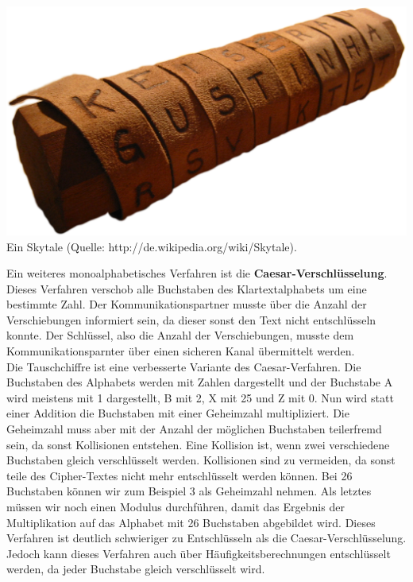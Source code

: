 \documentclass[12pt,a4paper]{report}
\begin{document}
\begin{onehalfspace}
\begin{center}
\includegraphics[scale=0.3]{img/krypto_skytale.png}\\
Ein Skytale (Quelle: http://de.wikipedia.org/wiki/Skytale).
\end{center}

Ein weiteres monoalphabetisches Verfahren ist die \textbf{Caesar-Verschlüsselung}. Dieses Verfahren verschob alle Buchstaben des Klartextalphabets um eine bestimmte Zahl. Der Kommunikationspartner musste über die Anzahl der Verschiebungen informiert sein, da dieser sonst den Text nicht entschlüsseln konnte. Der Schlüssel, also die Anzahl der Verschiebungen, musste dem Kommunikationsparnter über einen sicheren Kanal übermittelt werden. \cite{krypto01}\\

Die Tauschchiffre ist eine verbesserte Variante des Caesar-Verfahren. Die Buchstaben des Alphabets werden mit Zahlen dargestellt und der Buchstabe A wird meistens mit 1 dargestellt, B mit 2, X mit 25 und Z mit 0. Nun wird statt einer Addition die Buchstaben mit einer Geheimzahl multipliziert. Die Geheimzahl muss aber mit der Anzahl der möglichen Buchstaben teilerfremd sein, da sonst Kollisionen entstehen. Eine Kollision ist, wenn zwei verschiedene Buchstaben gleich verschlüsselt werden. Kollisionen sind zu vermeiden, da sonst teile des Cipher-Textes nicht mehr entschlüsselt werden können. Bei 26 Buchstaben können wir zum Beispiel 3 als Geheimzahl nehmen. Als letztes müssen wir noch einen Modulus durchführen, damit das Ergebnis der Multiplikation auf das Alphabet mit 26 Buchstaben abgebildet wird. Dieses Verfahren ist deutlich schwieriger zu Entschlüsseln als die Caesar-Verschlüsselung. Jedoch kann dieses Verfahren auch über Häufigkeitsberechnungen entschlüsselt werden, da jeder Buchstabe gleich verschlüsselt wird.  \cite{krypto01}\\


\end{onehalfspace}
\end{document}

